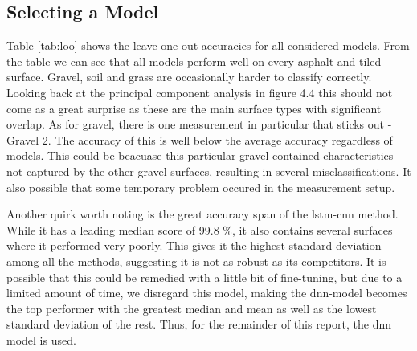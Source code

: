 \subsection{Selecting a Model}

Table \ref{tab:loo} shows the leave-one-out accuracies for all considered models. From the table we can see that all models perform well on every asphalt and tiled surface. Gravel, soil and grass are occasionally harder to classify correctly. Looking back at the principal component analysis in figure 4.4 this should not come as a great surprise as these are the main surface types with significant overlap. As for gravel, there is one measurement in particular that sticks out - Gravel 2. The accuracy of this is well below the average accuracy regardless of models. This could be beacuase this particular gravel contained characteristics not captured by the other gravel surfaces, resulting in several misclassifications. It also possible that some temporary problem occured in the measurement setup.

Another quirk worth noting is the great accuracy span of the \gls{lstm}-\gls{cnn} method. While it has a leading median score of 99.8 \%, it also contains several surfaces where it performed very poorly. This gives it the highest standard deviation among all the methods, suggesting it is not as robust as its competitors. It is possible that this could be remedied with a little bit of fine-tuning, but due to a limited amount of time, we disregard this model, making the  \gls{dnn}-model becomes the top performer with the greatest median and mean as well as the lowest standard deviation of the rest. Thus, for the remainder of this report, the \gls{dnn} model is used.







